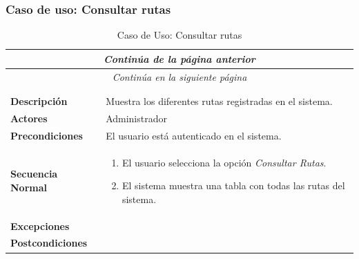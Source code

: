 \newpage
\subsubsection*{Caso de uso: Consultar rutas }
\begin{longtable}{| p{4cm} | p{10cm} |}
\endfirsthead
\multicolumn{2}{c}{\textit{Continúa de la página anterior}}\\[12pt]
\hline
\endhead
\hline
\multicolumn{2}{c}{\textit{Continúa en la siguiente página}} \\
\endfoot
\hline
\caption{Caso de Uso: Consultar rutas}\label{fig:1}\\
\endlastfoot


\hline
\multicolumn{2}{|c|}{\textbf{CU$<$26$>$ - Consultar Rutas}} \\

\hline
\textbf{Descripción} &
Muestra los diferentes rutas registradas en el sistema.\\

\hline
\textbf{Actores} &
Administrador\\

\hline
\textbf{Precondiciones} &
El usuario está autenticado en el sistema.\\

\hline
\textbf{Secuencia Normal} &\mbox{}\par\vspace{-\baselineskip}
\begin{enumerate}[leftmargin=0.7cm, topsep=0.1cm]
\item El usuario selecciona la opción \textit{Consultar Rutas}.
\item El sistema muestra una tabla con todas las rutas del sistema.
\end{enumerate}


\\
\hline
\textbf{Excepciones} &\mbox{}\par\vspace{-\baselineskip}
\\

\hline
\textbf{Postcondiciones} & \\
\hline
\end{longtable}



\newpage
